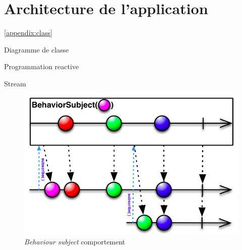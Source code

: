 \section{Architecture de l'application}

\ref{appendix:class}

Diagramme de classe

Programmation reactive

Stream
\begin{figure}[H]
  \includegraphics[width=.8\linewidth]{content/imgs/stream.png}
  \caption{\textit{Behaviour subject} comportement}
  \label{fig:stream}
\end{figure}
